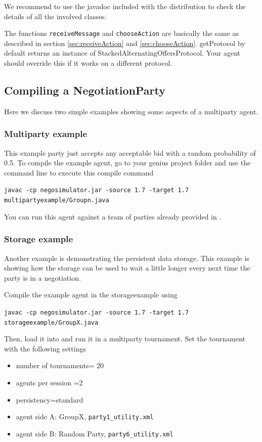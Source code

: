 \documentclass[]{article}
\begin{document}
We recommend to use the javadoc included with the distribution to check the details of all the involved classes. 

The functions \verb|receiveMessage| and \verb|chooseAction| are basically the same as described in section \ref{sec:receiveAction} and \ref{sec:chooseAction}. getProtocol by default returns an instance of StackedAlternatingOffersProtocol. Your agent should override this if it works on a different protocol.

\subsection{Compiling a NegotiationParty}
Here we discuss two simple examples showing some aspects of a multiparty agent.

\subsubsection{Multiparty example}
This example party just accepts any acceptable bid with a random probability of 0.5. To compile the example agent, go to your genius project folder and use the command line to execute this compile command

\verb|javac -cp negosimulator.jar -source 1.7 -target 1.7 multipartyexample/Groupn.java|

You can run this agent against a team of parties already provided in \Genius.

\subsubsection{Storage example}
Another example is demonstrating the persistent data storage. This example is showing how the storage can be used to wait a little longer every next time the party is in a negotiation.

Compile the example agent in the storageexample using

\verb|javac -cp negosimulator.jar -source 1.7 -target 1.7 storageexample/GroupX.java|

Then, load it into \Genius and run it in a multiparty tournament. Set the tournament with the following settings
\begin{itemize}
\item  number of tournaments= 20
\item   agents per session =2
\item  persistency=standard
\item  agent side A: GroupX, \verb|party1_utility.xml|
\item  agent side B: Random Party, \verb|party6_utility.xml|
\end{itemize}
\end{document}

